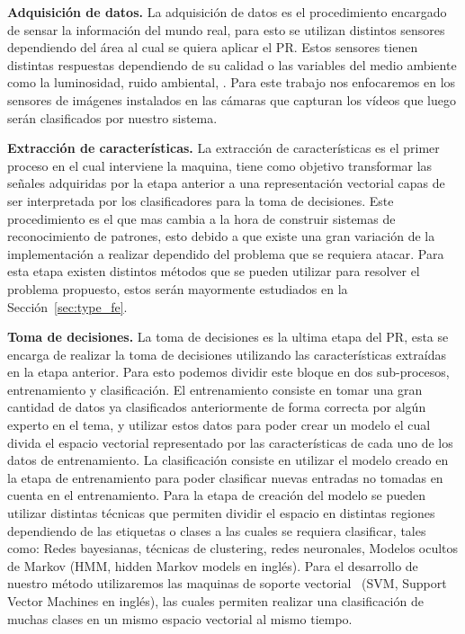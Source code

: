 	\textbf{Adquisición de datos.} La adquisición de datos es el procedimiento encargado de sensar la información del mundo real, para esto se utilizan distintos sensores dependiendo del área al cual se quiera aplicar el PR. Estos sensores tienen distintas respuestas dependiendo de su calidad o las variables del medio ambiente como la luminosidad, ruido ambiental, \etc. Para este trabajo nos enfocaremos en los sensores de imágenes instalados en las cámaras que capturan los vídeos que luego serán clasificados por nuestro sistema.
	
	\textbf{Extracción de características.} La extracción de características es el primer proceso en el cual interviene la maquina, tiene como objetivo transformar las señales adquiridas por la etapa anterior a una representación vectorial capas de ser interpretada por los clasificadores para la toma de decisiones. Este procedimiento es el que mas cambia a la hora de construir sistemas de reconocimiento de patrones, esto debido a que existe una gran variación de la implementación a realizar dependido del problema que se requiera atacar. Para esta etapa existen distintos métodos que se pueden utilizar para resolver el problema propuesto, estos serán mayormente estudiados en la Sección~\ref{sec:type_fe}.
	
	\textbf{Toma de decisiones.} La toma de decisiones es la ultima etapa del PR, esta se encarga de realizar la toma de decisiones utilizando las características extraídas en la etapa anterior. Para esto podemos dividir este bloque en dos sub-procesos, entrenamiento y clasificación. El entrenamiento consiste en tomar una gran cantidad de datos ya clasificados anteriormente de forma correcta por algún experto en el tema, y utilizar estos datos para poder crear un modelo el cual divida el espacio vectorial representado por las características de cada uno de los datos de entrenamiento. La clasificación consiste en utilizar el modelo creado en la etapa de entrenamiento para poder clasificar nuevas entradas no tomadas en cuenta en el entrenamiento. Para la etapa de creación del modelo se pueden utilizar distintas técnicas que permiten dividir el espacio en distintas regiones dependiendo de las etiquetas o clases a las cuales se requiera clasificar, tales como: Redes bayesianas, técnicas de clustering, redes neuronales, Modelos ocultos de Markov (HMM, hidden Markov models en inglés). Para el desarrollo de nuestro método utilizaremos las maquinas de soporte vectorial~\cite{Cortes1995,Hearst1998} (SVM, Support Vector Machines en inglés), las cuales permiten realizar una clasificación de muchas clases en un mismo espacio vectorial al mismo tiempo. 


